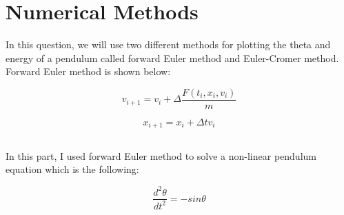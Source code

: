 \documentclass[letterpaper,12pt]{article}
\begin{document}
\section{Numerical Methods}
\label{sec:numericalmethods}
In this question, we will use two different methods for plotting the theta and energy of a pendulum called forward Euler method and Euler-Cromer method. Forward Euler method is shown below:

\begin{equation}
v_{i+1}=v_{i}+\Delta \frac{F(t_{i},x_{i},v_{i})}{m}
\end{equation}

\begin{equation}
x_{i+1}=x_{i}+\Delta tv_{i}
\end{equation}


\subsection{}In this part, I used forward Euler method to solve a non-linear pendulum equation which is the following: 

\begin{equation}
\frac{d^2\theta}{dt^2}=-sin\theta 
\end{equation}
\end{document}
